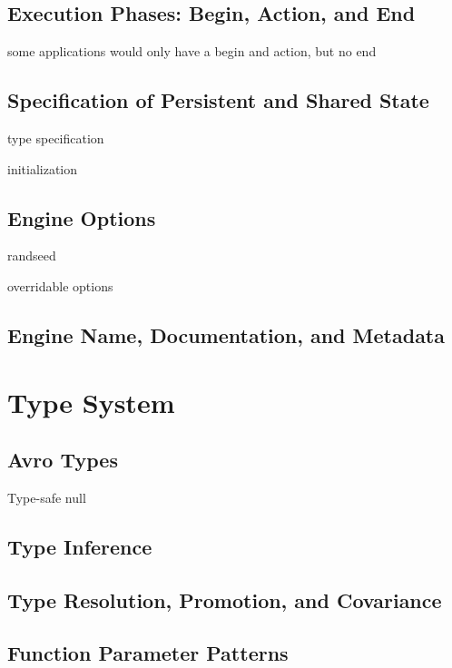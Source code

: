 \documentclass{article}
\begin{document}
\subsection{Execution Phases: Begin, Action, and End}

some applications would only have a begin and action, but no end

\subsection{Specification of Persistent and Shared State}

type specification

initialization

\subsection{Engine Options}

randseed

overridable options

\subsection{Engine Name, Documentation, and Metadata}

\pagebreak

\section{Type System}

\subsection{Avro Types}

Type-safe null

\subsection{Type Inference}

\subsection{Type Resolution, Promotion, and Covariance}

\subsection{Function Parameter Patterns}
\end{document}
